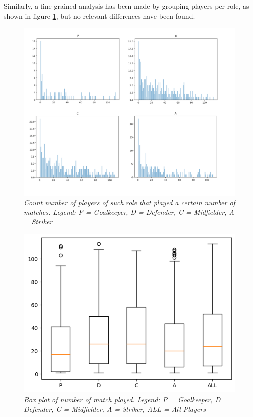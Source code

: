 Similarly, a fine grained analysis has been made by grouping players per role, as shown in figure \ref{fig:countMatchPerRole}, but no relevant differences have been found.
\begin{figure}[h]
  \includegraphics[scale=0.4]{images/img-02.png}
    \centering
   \caption{\textit{Count number of players of such role that played a certain number of matches.
   Legend: P = Goalkeeper, D = Defender, C = Midfielder, A = Striker}}
  \label{fig:countMatchPerRole}
\end{figure}

\begin{figure}[H]
  \includegraphics[scale=0.8]{images/quantile.png}
  \centering
   \caption{\textit{Box plot of number of match played. 
   Legend: P = Goalkeeper, D = Defender, C = Midfielder, A = Striker, ALL = All Players}}
  \label{fig:boxPlotMatchPlayed}
\end{figure}


